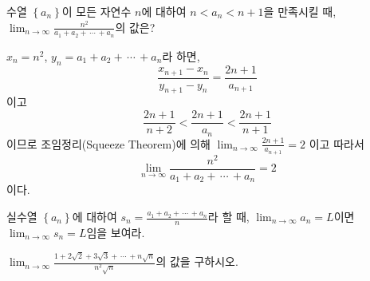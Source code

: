 \documentclass[11pt, a4paper]{book}
\begin{document}
\begin{example}[(2006 대수능)]
수열 $\left\{a_{n}\right\}$이 모든 자연수 $n$에 대하여 $n<a_{n}<n+1$을 만족시킬 때, $\displaystyle \lim_{n\to\infty}\frac{n^{2}}{a_{1}+a_{2}+\, \cdots \, +a_{n}}$의 값은?
\begin{solution}
$x_{n}=n^{2}$, $y_{n}=a_{1}+a_{2}+ \,\cdots \, + a_{n}$라 하면,
\begin{equation*}
	\frac{x_{n+1}-x_{n}}{y_{n+1}-y_{n}}=\frac{2n+1}{a_{n+1}}
\end{equation*}	
	이고
\begin{equation*}
	\frac{2n+1}{n+2}<\frac{2n+1}{a_{n}}<\frac{2n+1}{n+1}
\end{equation*}
이므로 조임정리(Squeeze Theorem)에 의해 $\displaystyle \lim_{n\to\infty}\frac{2n+1}{a_{n+1}}=2$
이고 따라서
\begin{equation*}
	\lim_{n\to\infty}\frac{n^{2}}{a_{1}+a_{2}+\,\cdots \, +a_{n}}=2
\end{equation*}
이다.
\end{solution}
\end{example}
\vspace{1em}
\begin{problem}
 실수열 $\left\{a_{n}\right\}$에 대하여 $s_{n}=\frac{a_{1}+a_{2}+\,\cdots\, + a_{n}}{n}$라 할 때, $\displaystyle\lim_{n\to\infty}a_{n}=L$이면 $\displaystyle\lim_{n\to\infty}s_{n}=L$임을 보여라.
\end{problem}
\vspace{1em}
\begin{problem}
 $\displaystyle \lim_{n\to\infty}\frac{1 + 2\sqrt{2}+3\sqrt{3}+\,\cdots \, + n\sqrt{n}}{n^{2}\sqrt{n}}$의 값을 구하시오.
\end{problem}
\end{document}
